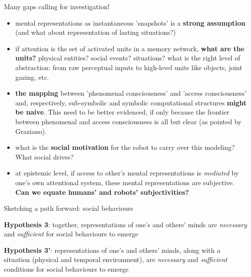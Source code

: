 \documentclass[xcolor=table]{beamer}
\begin{document}

\begin{frame}{Many gaps calling for investigation!}

\footnotesize
    \begin{itemize}

        \item<+-> mental representations as instantaneous 'snapshots' is a {\bf strong
            assumption} (and what about representation of lasting situations?)

        \item<+-> if attention is the set of activated units in a memory network,
            {\bf what are the units?} physical entities? social events? situations?
            what is the right level of abstraction: from raw perceptual inputs to
            high-level units like objects, joint gazing, etc.


        \item<+-> {\bf the mapping} between 'phenomenal consciousness' and
            'access consciousness' and, respectively, sub-symbolic and symbolic
            computational structures {\bf might be naive}. This need to be
            better evidenced, if only because the frontier between phenomenal
            and access consciousness is all but clear (as pointed by Graziano).

        \item<+-> what is the {\bf social motivation} for the robot to carry
            over this modeling? What social drives?

        \item<+-> at epistemic level, if access to other's mental
            representations is \emph{mediated} by one's own attentional system,
            these mental representations are subjective. {\bf Can we equate humans'
            and robots' subjectivities?}

    \end{itemize}

\end{frame}


\begin{frame}{Sketching a path forward: social behaviours}

    {\bf Hypothesis 3}: together, representations of one's and others' minds are
    \emph{necessary} and \emph{sufficient} for social behaviours to emerge

    {\bf Hypothesis 3'}: representations of one's and others' minds, along with
    a situation (physical and temporal environment), are \emph{necessary} and
    \emph{sufficient} conditions for social behaviours to emerge

    \pause

\end{frame}
\end{document}
